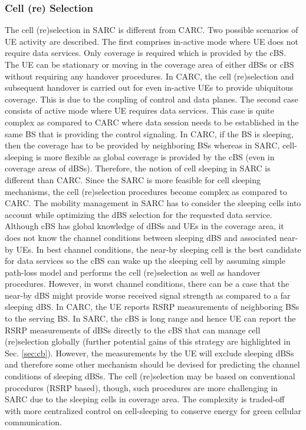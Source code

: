 \documentclass[article,10pt,twocolumn]{IEEEtran}
\begin{document}
\subsubsection{Cell (re) Selection}
The cell (re)selection in SARC is different from CARC. Two possible scenarios of UE activity are described. The first comprises in-active mode where UE does not require data services. Only coverage is required which is provided by the cBS. The UE can be stationary or moving in the coverage area of either dBSs or cBS without requiring any handover procedures. In CARC, the cell (re)selection and subsequent handover is carried out for even in-active UEs to provide ubiquitous coverage. This is due to the coupling of control and data planes. The second case consists of active mode where UE requires data services. This case is quite complex as compared to CARC where data session needs to be established in the same BS that is providing the control signaling. In CARC, if the BS is sleeping, then the coverage has to be provided by neighboring BSs whereas in SARC, cell-sleeping is more flexible as global coverage is provided by the cBS (even in coverage areas of dBSs). Therefore, the notion of cell sleeping in SARC is different than CARC. Since the SARC is more feasible for cell sleeping mechanisms, the cell (re)selection procedures become complex as compared to CARC. The mobility management in SARC has to consider the sleeping cells into account while optimizing the dBS selection for the requested data service. Although cBS has global knowledge of dBSs and UEs in the coverage area, it does not know the channel conditions between sleeping dBS and associated near-by UEs. In best channel conditions, the near-by sleeping cell is the best candidate for data services so the cBS can wake up the sleeping cell by assuming simple path-loss model and performs the cell (re)selection as well as handover procedures. However, in worst channel conditions, there can be a case that the near-by dBS might provide worse received signal strength as compared to a far sleeping dBS. In CARC, the UE reports RSRP measurements of neighboring BSs to the serving BS. In SARC, the cBS is long range and hence UE can report the RSRP measurements of dBSs directly to the cBS that can manage cell (re)selection globally (further potential gains of this strategy are highlighted in Sec. \ref{sec:cb}). However, the measurements by the UE will exclude sleeping dBSs and therefore some other mechanism should be devised for predicting the channel conditions of sleeping dBSs. The cell (re)selection may be based on conventional procedures (RSRP based), though, such procedures are more challenging in SARC due to the sleeping cells in coverage area. The complexity is traded-off with more centralized control on cell-sleeping to conserve energy for green cellular communication.
\end{document}
